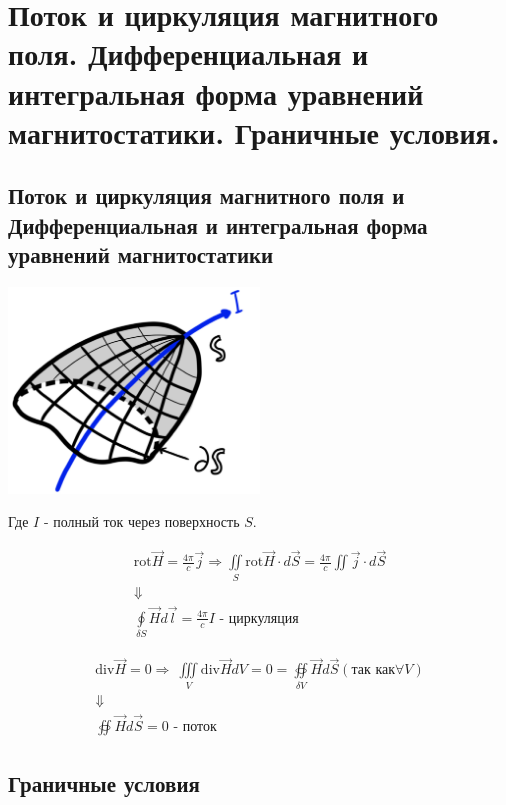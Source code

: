 \section{Поток и циркуляция магнитного поля. Дифференциальная и интегральная
форма уравнений магнитостатики. Граничные условия.}

\subsection*{Поток и циркуляция магнитного поля и Дифференциальная и интегральная
форма уравнений магнитостатики}

\begin{center}
    \includegraphics[width=0.5\textwidth]{im/66.png}
\end{center}

Где $I$ - полный ток через поверхность $S$. 
 
\begin{gather*}
    \mathrm{rot}\vec{H}=\frac{4\pi}{c}\vec{j}\Rightarrow \underset{S}{\iint}\mathrm{rot}\vec{H}\cdot d\vec{S}=\frac{4\pi}{c}\iint \vec{j}\cdot d\vec{S}  \\
    \Downarrow \\
    \boxed{\underset{\delta S}{\oint}\vec{H}d\vec{l}=\frac{4\pi}{c}I }\textit{ - циркуляция}
\end{gather*}

\begin{gather*}
    \mathrm{div}\vec{H}=0\Rightarrow \ \underset{V}{\iiint}\mathrm{div}\vec{H}dV=0=\underset{\delta V}{\oiint}\vec{H}d\vec{S}(\text{так как}\forall V) \\
    \Downarrow \\
    \boxed{\oiint \vec{H}d\vec{S}=0}\textit{ - поток}
\end{gather*}

\newpage

\subsection*{Граничные условия}

